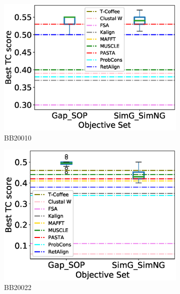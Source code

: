 \begin{figure}[!htbp]
\begin{adjustwidth}{-1.5cm}{-1cm}
\begin{subfigure}{0.22\textwidth}
			\includegraphics[width=\columnwidth]{Figure/summary/precomputedInit/Balibase/BB20010_objset_tc_rank_2}
			\caption{BB20010}
		\end{subfigure}
		\begin{subfigure}{0.22\textwidth}
			\includegraphics[width=\columnwidth]{Figure/summary/precomputedInit/Balibase/BB20022_objset_tc_rank_2}
			\caption{BB20022}
		\end{subfigure}
		\begin{subfigure}{0.22\textwidth}

\end{subfigure}
\end{adjustwidth}
\end{figure}
